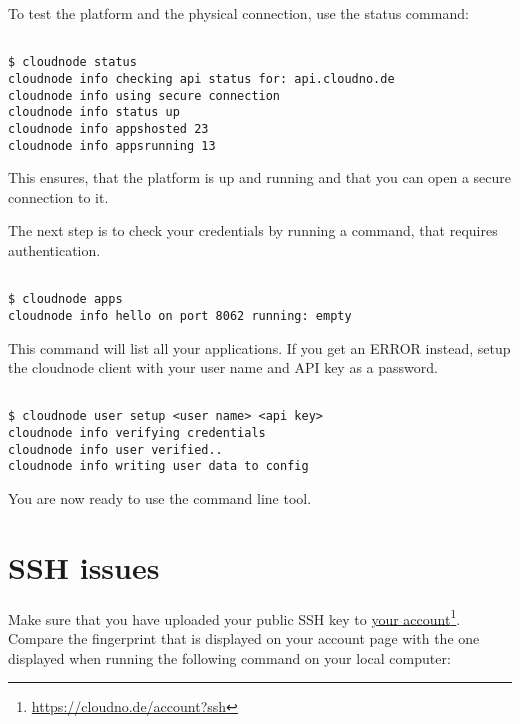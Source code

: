 To test the platform and the physical connection, use the status command:

\begin{adjustwidth}{2.5em}{2.5em}
\begin{verbatim}

$ cloudnode status
cloudnode info checking api status for: api.cloudno.de
cloudnode info using secure connection
cloudnode info status up
cloudnode info appshosted 23
cloudnode info appsrunning 13

\end{verbatim}
\end{adjustwidth}

This ensures, that the platform is up and running and that you can open a secure connection to it.

The next step is to check your credentials by running a command, that requires authentication.

\begin{adjustwidth}{2.5em}{2.5em}
\begin{verbatim}

$ cloudnode apps
cloudnode info hello on port 8062 running: empty

\end{verbatim}
\end{adjustwidth}

This command will list all your applications. If you get an ERROR instead, setup the cloudnode client with your user name and API key as a password.

\begin{adjustwidth}{2.5em}{2.5em}
\begin{verbatim}

$ cloudnode user setup <user name> <api key>
cloudnode info verifying credentials
cloudnode info user verified..
cloudnode info writing user data to config

\end{verbatim}
\end{adjustwidth}

You are now ready to use the command line tool.



\section{SSH issues}
\label{sshissues}

Make sure that you have uploaded your public SSH key to \href{https://cloudno.de/account?ssh}{your account}\footnote{\href{https://cloudno.de/account?ssh}{https:/\slash cloudno.de\slash account?ssh}}. Compare the fingerprint that is displayed on your account page with the one displayed when running the following command on your local computer:

